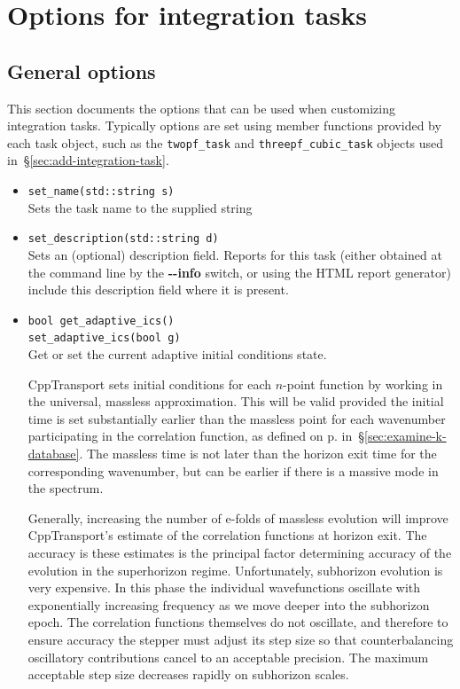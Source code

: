 \documentclass[11pt,a4paper]{article}
\newcommand{\packagefont}{\sffamily}
\newcommand{\CppTransport}{{\packagefont CppTransport}}
\newcommand{\option}[1]{{\ttfamily\bfseries\small #1}}
\begin{document}
\section{Options for integration tasks}
\label{sec:int-options}

\subsection{General options}
This section documents the options that can be used when customizing
integration tasks.
Typically options are set using member functions provided by
each task object, such as
the \texttt{twopf_task} and \texttt{threepf_cubic_task}
objects used in~\S\ref{sec:add-integration-task}.

\begin{itemize}
    \item \texttt{set_name(std::string s)} \\
    Sets the task name to the supplied string
    
    \item \texttt{set_description(std::string d)} \\
    Sets an (optional) description field. Reports
    for this task (either obtained
    at the command line by the \option{{-}{-}info} switch, or using the
    HTML report generator) include this description field where it is
    present.
    
    \item
    \label{enum:adpative-ics}
    \texttt{bool get_adaptive_ics()} \\
    \texttt{set_adaptive_ics(bool g)} \\
    Get or set the current adaptive initial conditions state.
    
    {\CppTransport} sets initial conditions for each $n$-point function
    by working in the universal, massless approximation.
    This will be valid provided the initial time is set substantially earlier
    than the massless point for each wavenumber
    participating in the correlation function,
    as defined on p.\pageref{enum:massless-time}
    in~\S\ref{sec:examine-k-database}.
    The massless time is not later than the horizon exit time for the corresponding
    wavenumber, but can be earlier if there is a massive mode in the spectrum.

    Generally, increasing the number of e-folds of massless evolution
    will improve {\CppTransport}'s estimate of the correlation functions
    at horizon exit.
    The accuracy is these estimates is the principal factor determining accuracy
    of the evolution in the superhorizon regime.
    Unfortunately, subhorizon evolution is very expensive.
    In this phase the individual wavefunctions oscillate with exponentially
    increasing frequency
    as we move deeper into the subhorizon epoch.
    The correlation functions themselves do not oscillate,
    and therefore to ensure accuracy the stepper must adjust its
    step size so that counterbalancing oscillatory contributions cancel
    to an acceptable precision.
    The maximum acceptable step size decreases rapidly on subhorizon
    scales.
    

\end{itemize}
\end{document}
